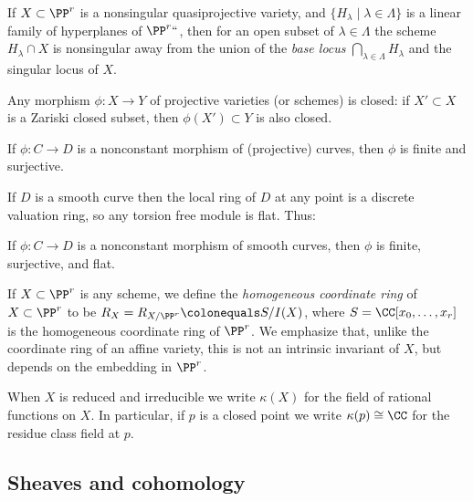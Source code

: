 \begin{theorem}\label{Bertini}
If $X\subset \PP^r$  is a nonsingular quasiprojective variety, and $\{H_\lambda \mid \lambda\in \Lambda\}$ is a linear family of hyperplanes of $\PP^r` `$, then for an open subset of $\lambda\in \Lambda$ the scheme $H_\lambda \cap X$ is nonsingular away from the union of the \emph{base locus}
$
\bigcap_{\lambda \in \Lambda} H_\lambda
$
and the singular locus of $X$.
%
\end{theorem}

\begin{theorem}
 Any morphism $\phi: X\to Y$ of projective varieties (or schemes) is closed: if $X'\subset X$ is a Zariski closed subset,
 then $\phi(X') \subset Y$ is also closed.
%
%
\end{theorem}

\begin{corollary}
If $\phi: C\to D$ is a nonconstant morphism of (projective) curves, then $\phi$ is finite and surjective. 
\end{corollary}

If $D$ is a 
smooth curve then the local ring of $D$ at any point is a discrete valuation ring, so any torsion free module is flat. 
Thus:

\begin{proposition}
If $\phi: C\to D$ is a nonconstant morphism of smooth curves, then $\phi$ is finite, surjective, and flat.
\end{proposition}

If $X\subset \PP^{r}$ is any scheme, we define the 
\emph{homogeneous coordinate ring}
%
of $X\subset \PP^{r}$
to be $R_{X} = R_{X/\PP^{r}}\colonequals S/I(X)$, where $S =\CC[x_{0}, \dots, x_{r}]$ is the homogeneous coordinate ring of $\PP^{r}$. We emphasize
that, unlike the coordinate ring of an affine variety, this is not an intrinsic invariant of $X$, but depends on the 
embedding in $\PP^{r}$. 

When $X$ is reduced and irreducible we write $\kappa(X)$ for the field of rational functions on $X$. In particular, if
$p$ is a closed point  we write $\kappa(p)\cong \CC$ for the residue class field at $p$.

\subsection*{Sheaves and cohomology} 

